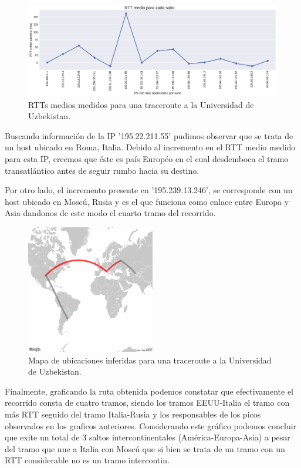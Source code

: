 \begin{figure}[H]
   \centering
       \includegraphics[width=1\textwidth, height=1\textheight, keepaspectratio]{../img/nuu-uz-rtts}
 \caption{RTTs medios medidos para una traceroute a la Universidad de Uzbekistan.}
 \label{fig:nuu-uz-rtts}
\end{figure}

Buscando información de la IP '195.22.211.55' pudimos observar que se trata de un host ubicado en Roma, Italia. Debido al incremento en el RTT medio medido para esta IP, creemos que éste es país Européo en el cual desdemboca el tramo transatlántico antes de seguir rumbo hacia su destino. \par

Por otro lado, el incremento presente en '195.239.13.246', se corresponde con un host ubicado en Moscú, Rusia y es el que funciona como enlace entre Europa y Asia dandonos de este modo el cuarto tramo del recorrido.\par 

\begin{figure}[H]
   \centering
       \includegraphics[width=0.5\textwidth, keepaspectratio]{../img/nuu-uz-map}
 \caption{Mapa de ubicaciones inferidas para una traceroute a la Universidad de Uzbekistan.}
 \label{fig:nuu-uz-map}
\end{figure}


Finalmente, graficando la ruta obtenida podemos constatar que efectivamente el recorrido consta de cuatro tramos, siendo los tramos EEUU-Italia el tramo con más RTT seguido del tramo Italia-Rusia y los responsables de los picos observados en los graficos anteriores. Considerando este gráfico podemos concluir que exite un total de 3 saltos intercontinentales (América-Europa-Asia) a pesar del tramo que une a Italia con Moscú que si bien se trata de un tramo con un RTT considerable no es un tramo intercontin.\par 

